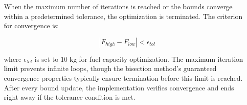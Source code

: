 When the maximum number of iterations is reached or the bounds converge within a predetermined tolerance, the optimization is terminated. The criterion for convergence is:

\begin{equation}
|F_{high} - F_{low}| < \epsilon_{tol}
\end{equation}

where $\epsilon_{tol}$ is set to 10 kg for fuel capacity optimization.  
The maximum iteration limit prevents infinite loops, though the bisection method's guaranteed convergence properties typically ensure termination before this limit is reached. After every bound update, the implementation verifies convergence and ends right away if the tolerance condition is met.
 
